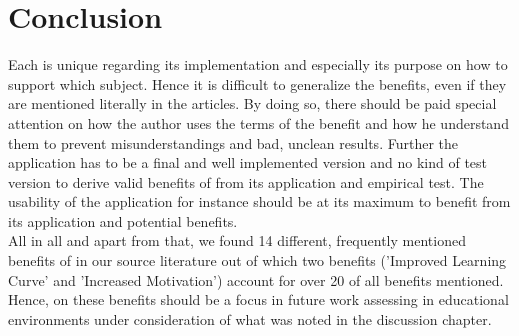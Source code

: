 \section{Conclusion}
Each \AR \app is unique regarding its implementation and especially its purpose on how to support which subject. Hence it is difficult to generalize the benefits, even if they are mentioned literally in the articles.
By doing so, there should be paid special attention on how the author uses the terms of the benefit and how he understand them to prevent misunderstandings and bad, unclean results. Further the application has to be a final 
and well implemented version and no kind of test version to derive valid benefits of \AR from its application and empirical test. The usability of the \AR application for instance should be at its maximum to 
benefit from its application and potential benefits. \\
All in all and apart from that, we found 14 different, frequently mentioned benefits of \AR in our source literature out of which two benefits ('Improved Learning Curve' and 'Increased Motivation') account for over 20%
of all benefits mentioned. Hence, on these benefits should be a focus in future work assessing \AR \apps in educational environments under consideration of what was noted in the discussion chapter.


